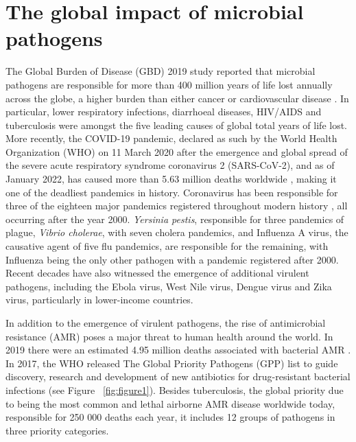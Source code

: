 \section{The global impact of microbial pathogens} \label{sec:global_impact}

The Global Burden of Disease (GBD) 2019 study reported that microbial pathogens are responsible for more than 400 million years of life lost annually across the globe, a higher burden than either cancer or cardiovascular disease \citep{vos_global_2020}. 
In particular, lower respiratory infections, diarrhoeal diseases, HIV/AIDS and tuberculosis were amongst the five leading causes of global total years of life lost. 
More recently, the COVID-19 pandemic, declared as such by the World Health Organization (WHO) on 11 March 2020 after the emergence and global spread of the severe acute respiratory syndrome coronavirus 2 (SARS-CoV-2), and as of January 2022, has caused more than 5.63 million deaths worldwide \citep{ritchie_coronavirus_2020}, making it one of the deadliest pandemics in history.
Coronavirus has been responsible for three of the eighteen major pandemics registered throughout modern history \citep{piret_pandemics_2021}, all occurring after the year 2000.
\textit{Yersinia pestis}, responsible for three pandemics of plague, \textit{Vibrio cholerae}, with seven cholera pandemics, and Influenza A virus, the causative agent of five flu pandemics, are responsible for the remaining, with Influenza being the only other pathogen with a pandemic registered after 2000. 
Recent decades have also witnessed the emergence of additional virulent pathogens, including the Ebola virus, West Nile virus, Dengue virus and Zika virus, particularly in lower-income countries.

In addition to the emergence of virulent pathogens, the rise of antimicrobial resistance (AMR) poses a major threat to human health around the world. 
In 2019 there were an estimated 4.95 million deaths associated with bacterial AMR \citep{murray_global_2022}. In 2017, the WHO released The Global Priority Pathogens (GPP) list \citep{world_health_organization_prioritization_2017} to guide discovery, research and development of new antibiotics for drug-resistant bacterial infections (see Figure ~\ref{fig:figure1}). 
Besides tuberculosis, the global priority due to being the most common and lethal airborne AMR disease worldwide today, responsible for 250 000 deaths each year, it includes 12 groups of pathogens in three priority categories. 

